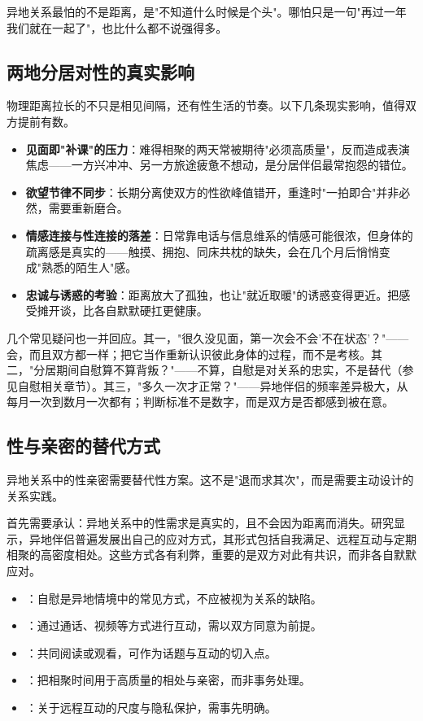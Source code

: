 \begin{tcolorbox}[colback=pink!5!white,colframe=red!50!black,title=贴心小叮咛]
异地关系最怕的不是距离，是"不知道什么时候是个头"。哪怕只是一句"再过一年我们就在一起了"，也比什么都不说强得多。
\end{tcolorbox}
\subsection{两地分居对性的真实影响}

物理距离拉长的不只是相见间隔，还有性生活的节奏。以下几条现实影响，值得双方提前有数。

\begin{itemize}
  \item \textbf{见面即"补课"的压力}：难得相聚的两天常被期待"必须高质量"，反而造成表演焦虑——一方兴冲冲、另一方旅途疲惫不想动，是分居伴侣最常抱怨的错位。
  \item \textbf{欲望节律不同步}：长期分离使双方的性欲峰值错开，重逢时"一拍即合"并非必然，需要重新磨合。
  \item \textbf{情感连接与性连接的落差}：日常靠电话与信息维系的情感可能很浓，但身体的疏离感是真实的——触摸、拥抱、同床共枕的缺失，会在几个月后悄悄变成"熟悉的陌生人"感。
  \item \textbf{忠诚与诱惑的考验}：距离放大了孤独，也让"就近取暖"的诱惑变得更近。把感受摊开谈，比各自默默硬扛更健康。
\end{itemize}

几个常见疑问也一并回应。其一，"很久没见面，第一次会不会'不在状态'？"——会，而且双方都一样；把它当作重新认识彼此身体的过程，而不是考核。其二，"分居期间自慰算不算背叛？"——不算，自慰是对关系的忠实，不是替代（参见自慰相关章节）。其三，"多久一次才正常？"——异地伴侣的频率差异极大，从每月一次到数月一次都有；判断标准不是数字，而是双方是否都感到被在意。

\subsection{性与亲密的替代方式}

异地关系中的性亲密需要替代性方案。这不是"退而求其次"，而是需要主动设计的关系实践。

首先需要承认：异地关系中的性需求是真实的，且不会因为距离而消失。研究显示，异地伴侣普遍发展出自己的应对方式，其形式包括自我满足、远程互动与定期相聚的高密度相处。这些方式各有利弊，重要的是双方对此有共识，而非各自默默应对。

\begin{itemize}
  \item {}：自慰是异地情境中的常见方式，不应被视为关系的缺陷。
  \item {}：通过通话、视频等方式进行互动，需以双方同意为前提。
  \item {}：共同阅读或观看，可作为话题与互动的切入点。
  \item {}：把相聚时间用于高质量的相处与亲密，而非事务处理。
  \item {}：关于远程互动的尺度与隐私保护，需事先明确。
\end{itemize}

